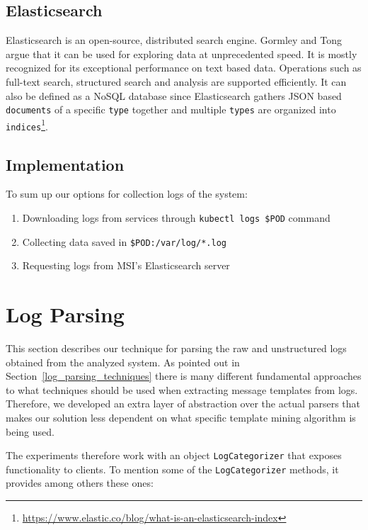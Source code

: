 \subsection{Elasticsearch}
Elasticsearch is an open-source, distributed search engine. Gormley and Tong \cite{gormley2015elasticsearch} argue that it can be used for exploring data at unprecedented speed. It is mostly recognized for its exceptional performance on text based data. Operations such as full-text search, structured search and analysis are supported efficiently.
It can also be defined as a NoSQL database since Elasticsearch gathers JSON based \texttt{documents} of a specific \texttt{type} together and multiple \texttt{types} are organized into \texttt{indices}\footnote{\url{https://www.elastic.co/blog/what-is-an-elasticsearch-index}}. 

\subsection{Implementation}

To sum up our options for collection logs of the system:
\begin{enumerate}
    \item Downloading logs from services through \texttt{kubectl logs \${POD}} command
    \item Collecting data saved in \texttt{\${POD}:/var/log/*.log}
    \item Requesting logs from MSI's Elasticsearch server
\end{enumerate}


\section{Log Parsing}
This section describes our technique for parsing the raw and unstructured logs obtained from the analyzed system.
As pointed out in Section~\ref{log_parsing_techniques} there is many different fundamental approaches to what techniques should be used when extracting message templates from logs. 
Therefore, we developed an extra layer of abstraction over the actual parsers that makes our solution less dependent on what specific template mining algorithm is being used.

The experiments therefore work with an object \texttt{LogCategorizer} that exposes functionality to clients. To mention some of the \texttt{LogCategorizer} methods, it provides among others these ones:

